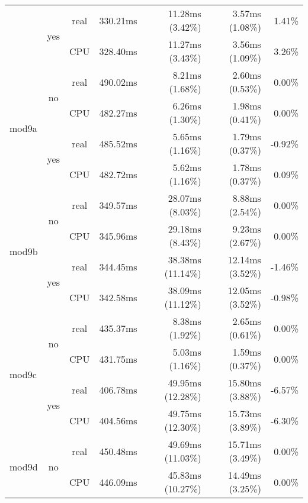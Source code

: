 \documentclass[en]{pracamgr}
\begin{document}
\begin{small}
\begin{longtable}{|l|c|c|r|r|r|r|}
                          \cline{2-7}
                          & \multirow{2}{*}{yes} & real & 330.21ms & 11.28ms (3.42\%) & 3.57ms (1.08\%) & 1.41\% \\*
                          &                      & CPU  & 328.40ms & 11.27ms (3.43\%) & 3.56ms (1.09\%) & 3.26\% \\
\hline
\multirow{4}{*}{mod9a}    & \multirow{2}{*}{no}  & real & 490.02ms & 8.21ms (1.68\%) & 2.60ms (0.53\%) & 0.00\% \\*
                          &                      & CPU  & 482.27ms & 6.26ms (1.30\%) & 1.98ms (0.41\%) & 0.00\% \\*
                          \cline{2-7}
                          & \multirow{2}{*}{yes} & real & 485.52ms & 5.65ms (1.16\%) & 1.79ms (0.37\%) & -0.92\% \\*
                          &                      & CPU  & 482.72ms & 5.62ms (1.16\%) & 1.78ms (0.37\%) & 0.09\% \\
\hline
\multirow{4}{*}{mod9b}    & \multirow{2}{*}{no}  & real & 349.57ms & 28.07ms (8.03\%) & 8.88ms (2.54\%) & 0.00\% \\*
                          &                      & CPU  & 345.96ms & 29.18ms (8.43\%) & 9.23ms (2.67\%) & 0.00\% \\*
                          \cline{2-7}
                          & \multirow{2}{*}{yes} & real & 344.45ms & 38.38ms (11.14\%) & 12.14ms (3.52\%) & -1.46\% \\*
                          &                      & CPU  & 342.58ms & 38.09ms (11.12\%) & 12.05ms (3.52\%) & -0.98\% \\
\hline
\multirow{4}{*}{mod9c}    & \multirow{2}{*}{no}  & real & 435.37ms & 8.38ms (1.92\%) & 2.65ms (0.61\%) & 0.00\% \\*
                          &                      & CPU  & 431.75ms & 5.03ms (1.16\%) & 1.59ms (0.37\%) & 0.00\% \\*
                          \cline{2-7}
                          & \multirow{2}{*}{yes} & real & 406.78ms & 49.95ms (12.28\%) & 15.80ms (3.88\%) & -6.57\% \\*
                          &                      & CPU  & 404.56ms & 49.75ms (12.30\%) & 15.73ms (3.89\%) & -6.30\% \\
\hline
\multirow{4}{*}{mod9d}    & \multirow{2}{*}{no}  & real & 450.48ms & 49.69ms (11.03\%) & 15.71ms (3.49\%) & 0.00\% \\*
                          &                      & CPU  & 446.09ms & 45.83ms (10.27\%) & 14.49ms (3.25\%) & 0.00\% \\*

\end{longtable}
\end{small}
\end{document}
